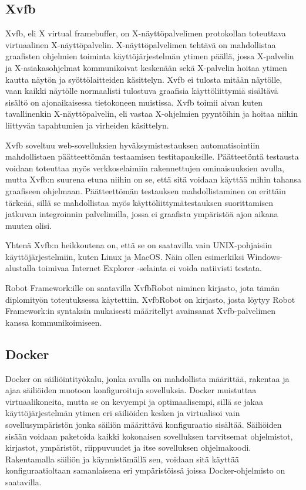   \subsection{Xvfb} \label{ch:08_xvfb}

    Xvfb, eli X virtual framebuffer, on X-näyttöpalvelimen protokollan toteuttava virtuaalinen X-näyttöpalvelin.
    X-näyttöpalvelimen tehtävä on mahdollistaa graafisten ohjelmien toiminta käyttöjärjestelmän ytimen päällä, jossa X-palvelin ja X-asiakasohjelmat kommunikoivat keskenään sekä X-palvelin hoitaa ytimen kautta näytön ja syöttölaitteiden käsittelyn.
    Xvfb ei tulosta mitään näytölle, vaan kaikki näytölle normaalisti tulostuva graafisia käyttöliittymiä sisältävä sisältö on ajonaikaisessa tietokoneen muistissa.
    Xvfb toimii aivan kuten tavallinenkin X-näyttöpalvelin, eli vastaa X-ohjelmien pyyntöihin ja hoitaa niihin liittyvän tapahtumien ja virheiden käsittelyn.

    Xvfb soveltuu web-sovelluksien hyväksymistestauksen automatisointiin mahdollistaen päätteettömän testaamisen testitapauksille.
    Päätteetöntä testausta voidaan toteuttaa myös verkkoselaimiin rakennettujen ominaisuuksien avulla, mutta Xvfb:n suurena etuna niihin on se, että sitä voidaan käyttää mihin tahansa graafiseen ohjelmaan.
    Päätteettömän testauksen mahdollistaminen on erittäin tärkeää, sillä se mahdollistaa myös käyttöliittymätestauksen suorittamisen jatkuvan integroinnin palvelimilla, jossa ei graafista ympäristöä ajon aikana muuten olisi.

    Yhtenä Xvfb:n heikkoutena on, että se on saatavilla vain UNIX-pohjaisiin käyttöjärjestelmiin, kuten Linux ja MacOS.
    Näin ollen esimerkiksi Windows-alustalla toimivaa Internet Explorer -selainta ei voida natiivisti testata.

    Robot Framework:ille on saatavilla XvfbRobot niminen kirjasto, jota tämän diplomityön toteutuksessa käytettiin.
    XvfbRobot on kirjasto, josta löytyy Robot Framework:in syntaksin mukaisesti määritellyt avainsanat Xvfb-palvelimen kanssa kommunikoimiseen.

  \subsection{Docker} \label{ch:08_docker}

    Docker on säiliöintityökalu, jonka avulla on mahdollista määrittää, rakentaa ja ajaa säiliöiden muotoon konfiguroituja sovelluksia.
    Docker muistuttaa virtuaalikoneita, mutta se on kevyempi ja optimaalisempi, sillä se jakaa käyttöjärjestelmän ytimen eri säiliöiden kesken ja virtualisoi vain sovellusympäristön jonka säiliön määrittävä konfiguraatio sisältää.
    Säiliöiden sisään voidaan paketoida kaikki kokonaisen sovelluksen tarvitsemat ohjelmistot, kirjastot, ympäristöt, riippuvuudet ja itse sovelluksen ohjelmakoodi.
    Rakentamalla säiliön ja käynnistämällä sen, voidaan sitä käyttää konfiguraatioltaan samanlaisena eri ympäristöissä joissa Docker-ohjelmisto on saatavilla.

